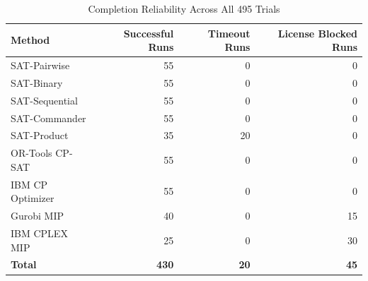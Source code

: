 \begin{table}[h]
\centering
\caption{Completion Reliability Across All 495 Trials}
\begin{tabular}{@{}lrrr@{}}
\toprule
Method & Successful Runs & Timeout Runs & License Blocked Runs \\
\midrule
SAT-Pairwise & 55 & 0 & 0 \\
SAT-Binary & 55 & 0 & 0 \\
SAT-Sequential & 55 & 0 & 0 \\
SAT-Commander & 55 & 0 & 0 \\
SAT-Product & 35 & 20 & 0 \\
OR-Tools CP-SAT & 55 & 0 & 0 \\
IBM CP Optimizer & 55 & 0 & 0 \\
Gurobi MIP & 40 & 0 & 15 \\
IBM CPLEX MIP & 25 & 0 & 30 \\
\midrule
\textbf{Total} & \textbf{430} & \textbf{20} & \textbf{45} \\
\bottomrule
\end{tabular}
\label{tab:reliability}
\end{table}
